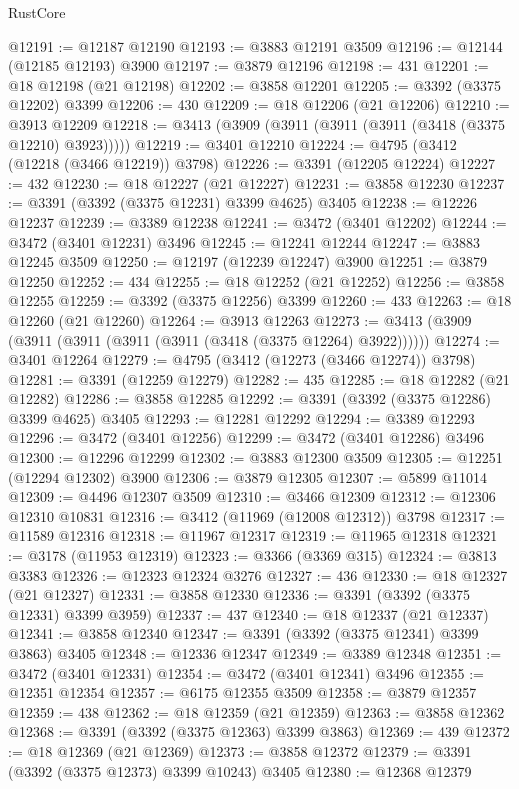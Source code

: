 \begin{lexlean}{RustCore}
\begin{coremodule}
@12191 := @12187 @12190
@12193 := @3883 @12191 @3509
@12196 := @12144 (@12185 @12193) @3900
@12197 := @3879 @12196
@12198 := 431
@12201 := @18 @12198 (@21 @12198)
@12202 := @3858 @12201
@12205 := @3392 (@3375 @12202) @3399
@12206 := 430
@12209 := @18 @12206 (@21 @12206)
@12210 := @3913 @12209
@12218 := @3413 (@3909 (@3911 (@3911 (@3911 (@3418 (@3375 @12210) @3923)))))
@12219 := @3401 @12210
@12224 := @4795 (@3412 (@12218 (@3466 @12219)) @3798)
@12226 := @3391 (@12205 @12224)
@12227 := 432
@12230 := @18 @12227 (@21 @12227)
@12231 := @3858 @12230
@12237 := @3391 (@3392 (@3375 @12231) @3399 @4625) @3405
@12238 := @12226 @12237
@12239 := @3389 @12238
@12241 := @3472 (@3401 @12202)
@12244 := @3472 (@3401 @12231) @3496
@12245 := @12241 @12244
@12247 := @3883 @12245 @3509
@12250 := @12197 (@12239 @12247) @3900
@12251 := @3879 @12250
@12252 := 434
@12255 := @18 @12252 (@21 @12252)
@12256 := @3858 @12255
@12259 := @3392 (@3375 @12256) @3399
@12260 := 433
@12263 := @18 @12260 (@21 @12260)
@12264 := @3913 @12263
@12273 := @3413 (@3909 (@3911 (@3911 (@3911 (@3911 (@3418 (@3375 @12264) @3922))))))
@12274 := @3401 @12264
@12279 := @4795 (@3412 (@12273 (@3466 @12274)) @3798)
@12281 := @3391 (@12259 @12279)
@12282 := 435
@12285 := @18 @12282 (@21 @12282)
@12286 := @3858 @12285
@12292 := @3391 (@3392 (@3375 @12286) @3399 @4625) @3405
@12293 := @12281 @12292
@12294 := @3389 @12293
@12296 := @3472 (@3401 @12256)
@12299 := @3472 (@3401 @12286) @3496
@12300 := @12296 @12299
@12302 := @3883 @12300 @3509
@12305 := @12251 (@12294 @12302) @3900
@12306 := @3879 @12305
@12307 := @5899 @11014
@12309 := @4496 @12307 @3509
@12310 := @3466 @12309
@12312 := @12306 @12310 @10831
@12316 := @3412 (@11969 (@12008 @12312)) @3798
@12317 := @11589 @12316
@12318 := @11967 @12317
@12319 := @11965 @12318
@12321 := @3178 (@11953 @12319)
@12323 := @3366 (@3369 @315)
@12324 := @3813 @3383
@12326 := @12323 @12324 @3276
@12327 := 436
@12330 := @18 @12327 (@21 @12327)
@12331 := @3858 @12330
@12336 := @3391 (@3392 (@3375 @12331) @3399 @3959)
@12337 := 437
@12340 := @18 @12337 (@21 @12337)
@12341 := @3858 @12340
@12347 := @3391 (@3392 (@3375 @12341) @3399 @3863) @3405
@12348 := @12336 @12347
@12349 := @3389 @12348
@12351 := @3472 (@3401 @12331)
@12354 := @3472 (@3401 @12341) @3496
@12355 := @12351 @12354
@12357 := @6175 @12355 @3509
@12358 := @3879 @12357
@12359 := 438
@12362 := @18 @12359 (@21 @12359)
@12363 := @3858 @12362
@12368 := @3391 (@3392 (@3375 @12363) @3399 @3863)
@12369 := 439
@12372 := @18 @12369 (@21 @12369)
@12373 := @3858 @12372
@12379 := @3391 (@3392 (@3375 @12373) @3399 @10243) @3405
@12380 := @12368 @12379

\end{coremodule}
\end{lexlean}
